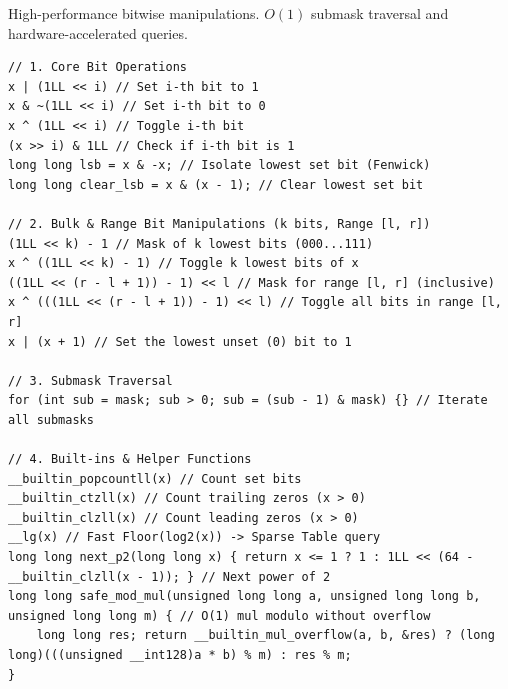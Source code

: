 
High-performance bitwise manipulations. $O(1)$ submask traversal and hardware-accelerated queries.

\begin{lstlisting}
// 1. Core Bit Operations
x | (1LL << i) // Set i-th bit to 1
x & ~(1LL << i) // Set i-th bit to 0
x ^ (1LL << i) // Toggle i-th bit
(x >> i) & 1LL // Check if i-th bit is 1
long long lsb = x & -x; // Isolate lowest set bit (Fenwick)
long long clear_lsb = x & (x - 1); // Clear lowest set bit

// 2. Bulk & Range Bit Manipulations (k bits, Range [l, r])
(1LL << k) - 1 // Mask of k lowest bits (000...111)
x ^ ((1LL << k) - 1) // Toggle k lowest bits of x
((1LL << (r - l + 1)) - 1) << l // Mask for range [l, r] (inclusive)
x ^ (((1LL << (r - l + 1)) - 1) << l) // Toggle all bits in range [l, r]
x | (x + 1) // Set the lowest unset (0) bit to 1

// 3. Submask Traversal
for (int sub = mask; sub > 0; sub = (sub - 1) & mask) {} // Iterate all submasks

// 4. Built-ins & Helper Functions
__builtin_popcountll(x) // Count set bits
__builtin_ctzll(x) // Count trailing zeros (x > 0)
__builtin_clzll(x) // Count leading zeros (x > 0)
__lg(x) // Fast Floor(log2(x)) -> Sparse Table query
long long next_p2(long long x) { return x <= 1 ? 1 : 1LL << (64 - __builtin_clzll(x - 1)); } // Next power of 2
long long safe_mod_mul(unsigned long long a, unsigned long long b, unsigned long long m) { // O(1) mul modulo without overflow
    long long res; return __builtin_mul_overflow(a, b, &res) ? (long long)(((unsigned __int128)a * b) % m) : res % m;
}
\end{lstlisting}
